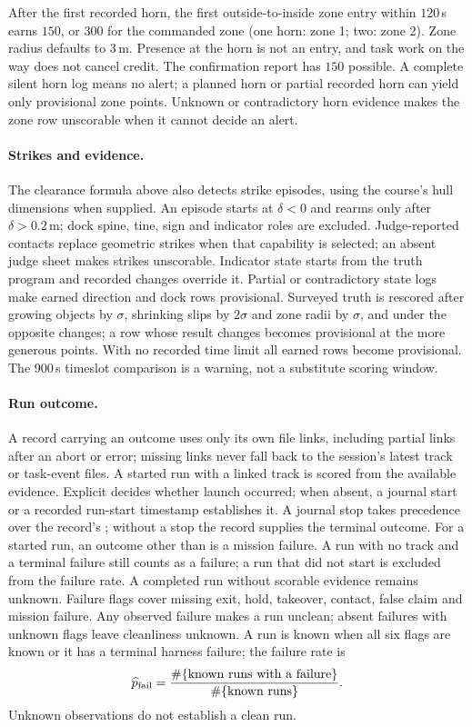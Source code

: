 After the first recorded horn, the first outside-to-inside zone entry within
$120$\,s earns $150$, or $300$ for the commanded zone (one horn: zone 1;
two: zone 2). Zone radius defaults to $3$\,m. Presence at the horn is not an
entry, and task work on the way does not cancel credit. The confirmation report
has $150$ possible. A complete silent horn log means no alert; a planned horn
or partial recorded horn can yield only provisional zone points. Unknown or
contradictory horn evidence makes the zone row unscorable when it cannot decide
an alert.

\paragraph{Strikes and evidence.} The clearance formula above also detects
strike episodes, using the course's hull dimensions when supplied. An episode
starts at $\delta<0$ and rearms only after $\delta>0.2$\,m; dock spine, tine,
sign and indicator roles are excluded. Judge-reported contacts replace geometric
strikes when that capability is selected; an absent judge sheet makes strikes
unscorable. Indicator state starts from the truth program and recorded changes
override it. Partial or contradictory state logs make earned direction and dock
rows provisional. Surveyed truth is rescored after growing objects by
$\sigma$, shrinking slips by $2\sigma$ and zone radii by $\sigma$, and under
the opposite changes; a row whose result changes becomes provisional at the
more generous points. With no recorded time limit all earned rows become
provisional. The $900$\,s timeslot comparison is a warning, not a substitute
scoring window.

\paragraph{Run outcome.} A record carrying an outcome uses only its own file
links, including partial links after an abort or error; missing links never
fall back to the session's latest track or task-event files. A started run with
a linked track is scored from the available evidence. Explicit 
decides whether launch occurred; when absent, a journal start or a recorded
run-start timestamp establishes it. A journal stop takes precedence over the
record's ; without a stop the record supplies the terminal outcome.
For a started run, an outcome other than  is a mission failure.
A run with no track and a terminal failure still counts as a failure; a run
that did not start is excluded from the failure rate. A completed run without
scorable evidence remains unknown. Failure flags cover missing exit, hold,
takeover, contact, false claim and mission failure. Any observed failure makes
a run unclean; absent failures with unknown flags leave cleanliness unknown. A run is known when all six
flags are known or it has a terminal harness failure; the failure rate is
\[
 \widehat p_{\rm fail}=\frac{\#\{\text{known runs with a failure}\}}
                              {\#\{\text{known runs}\}}.
\]
Unknown observations do not establish a clean run.
